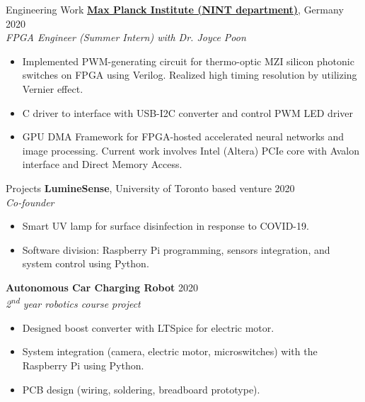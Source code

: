\documentclass[hidelinks]{my_resume} %
\begin{document}
    \begin{minipage}[t]{0.66\textwidth} 




    \begin{rSection}{Engineering Work}
        \vspace{5pt}
        \href{https://www.mpi-halle.mpg.de/NINT}{\textbf{Max Planck Institute (NINT department)}}, Germany    \hfill{2020}\\
        \emph{FPGA Engineer (Summer Intern) with Dr. Joyce Poon}
        \vspace{5pt}
        \begin{itemize}
            \item Implemented PWM-generating circuit for thermo-optic MZI silicon photonic switches on FPGA using Verilog. Realized high timing \mbox{resolution} by utilizing Vernier effect.
            \item C driver to interface with USB-I2C converter and control PWM LED driver
            \item GPU DMA Framework for FPGA-hosted accelerated neural \mbox{networks} and image processing. Current work involves Intel (Altera) PCIe core with Avalon interface and Direct Memory Access. 
        \end{itemize}

    \end{rSection}
        \vspace{5pt} 
    \begin{rSection}{Projects}    
        \vspace{5pt} 
        \textbf{LumineSense}, University of Toronto based venture   \hfill{2020} \\
        \emph{Co-founder}
        \begin{itemize}
            \item Smart UV lamp for surface disinfection in response to COVID-19.
            \item Software division: Raspberry Pi programming, sensors integration, and system control using Python. 
        \end{itemize}

        \vspace{5pt} 
        \textbf{Autonomous Car Charging Robot} \hfill{2020}\\
        \emph{2\textsuperscript{nd} year robotics course project}
        \begin{itemize}
            \item Designed boost converter with LTSpice for electric motor.
            \item System integration (camera, electric motor, microswitches) with the Raspberry Pi using Python. 
            \item PCB design (wiring, soldering, breadboard prototype).  
        \end{itemize}
    \end{rSection}


\end{minipage}
\end{document}
